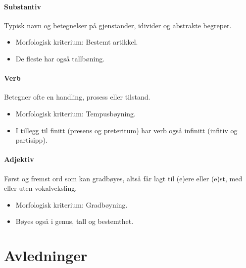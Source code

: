 \paragraph{Substantiv} Typisk navn og betegnelser på gjenstander, idivider og abstrakte begreper.
	\begin{itemize}
		\item Morfologisk kriterium: Bestemt artikkel.
		
		
		\item De fleste har også tallbøning.
		
		
	\end{itemize}
\paragraph{Verb} Betegner ofte en handling, prosess eller tilstand.
	\begin{itemize}
		\item Morfologisk kriterium: Tempusbøyning.

		
		\item I tillegg til finitt (presens og preteritum) har verb også infinitt (infitiv og partisipp). 
	\end{itemize}
	
\paragraph{Adjektiv} Først og fremst ord som kan gradbøyes, altså får lagt til (e)ere eller (e)st, med eller uten vokalveksling.
	\begin{itemize}
		\item Morfologisk kriterium: Gradbøyning.
		
		\newline
		
		\item Bøyes også i genus, tall og bestemthet.
	\end{itemize}

\section{Avledninger}

